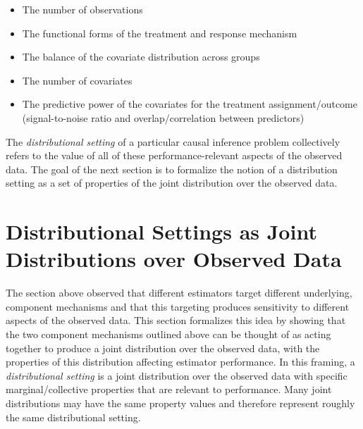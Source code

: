 \documentclass[../main.tex]{subfiles}
\begin{document}
\vspace{\baselineskip}
\begin{itemize}
	\item The number of observations\par

	\item The functional forms of the treatment and response mechanism\par

	\item The balance of the covariate distribution across groups\par

	\item The number of covariates\par

	\item The predictive power of the covariates for the treatment assignment/outcome (signal-to-noise ratio and overlap/correlation between predictors)
\end{itemize}\par


\vspace{\baselineskip}
The \textit{distributional setting} of a particular causal inference problem collectively refers to the value of all of these performance-relevant aspects of the observed data. The goal of the next section is to formalize the notion of a distribution setting as a set of properties of the joint distribution over the observed data.

\section{Distributional Settings as Joint Distributions over Observed Data}

\vspace{\baselineskip}
The section above observed that different estimators target different underlying, component mechanisms and that this targeting produces sensitivity to different aspects of the observed data. This section formalizes this idea by showing that the two component mechanisms outlined above can be thought of as acting together to produce a joint distribution over the observed data, with the properties of this distribution affecting estimator performance. In this framing, a \textit{distributional setting }is a joint distribution over the observed data with specific marginal/collective properties that are relevant to performance. Many joint distributions may have the same property values and therefore represent roughly the same distributional setting.\par
\end{document}

